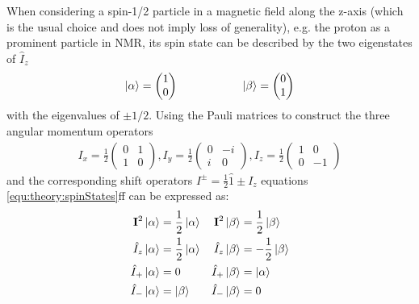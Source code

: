             When considering a spin-1/2 particle in a magnetic field along the z-axis (which is the usual choice and does not imply loss of generality), e.g. the proton as a prominent particle in NMR, its spin state can be described by the two eigenstates of $\hat{I}_z$ 
            \begin{equation}
            \ket\alpha = \begin{pmatrix}1\\0\end{pmatrix} \hspace{2 cm} \ket\beta =
            \begin{pmatrix}0\\1\end{pmatrix}
            \end{equation}
            with the eigenvalues of $\pm 1/2$. Using the Pauli matrices to construct the three angular momentum operators
            \begin{align*}
                I_x = \frac{1}{2}
                \begin{pmatrix}
                    0 & 1\\
                    1 & 0
                \end{pmatrix}, 
                I_y = \frac{1}{2}
                \begin{pmatrix}
                    0 & -i\\
                    i & 0
                \end{pmatrix}, 
                I_z = \frac{1}{2}
                \begin{pmatrix}
                    1 & 0\\
                    0 & -1
                \end{pmatrix} 
            \end{align*}
            and the corresponding shift operators $I^\pm = \frac{1}{2} \hat 1 \pm I_z$ equations \ref{equ:theory:spinStates}ff can be expressed as:
            \begin{align*}
                \mathbf{I}^2 \ket{\alpha} &= \frac{1}{2}\ket{\alpha}&\mathbf{I}^2 \ket{\beta} &= \frac{1}{2}\ket{\beta}\\
                \hat{I}_z\ket\alpha &= \frac{1}{2}\ket\alpha &\hat{I}_z\ket\beta &= -\frac{1}{2}\ket\beta\\
                \hat{I}_+\ket\alpha &= 0 &\hat{I}_+\ket\beta &= \ket\alpha\\
                \hat{I}_-\ket\alpha &= \ket\beta& \hat{I}_-\ket\beta &= 0
            \end{align*}
